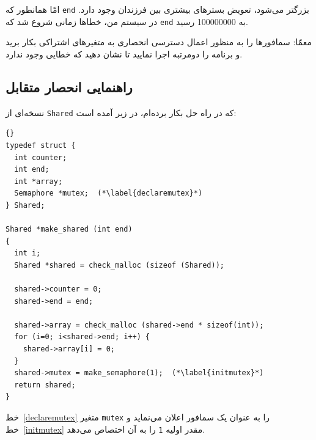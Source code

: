 \documentclass{book}
\newcommand{\clearemptydoublepage}{\newpage\cleardoublepage}
\begin{document}
    امّا همانطور که {\tt end}  بزرگتر می‌شود، تعویض بسترهای بیشتری بین فرزندان وجود دارد. 
    در سیستم من، خطاها زمانی شروع شد که {\tt end} به  100000000 رسید. 

    معمّا:‌ سمافورها را به منظور اعمال دسترسی انحصاری به متغیرهای اشتراکی بکار برید و برنامه را دومرتبه اجرا نمایید تا نشان دهید که خطایی وجود ندارد. 
    

\clearemptydoublepage
\subsection{راهنمایی انحصار متقابل}

    نسخه‌ای از {\tt Shared} که در راه حل بکار برده‌ام، در زیر آمده است:

\begin{latin}
\begin{lstlisting}[title={}]{}
typedef struct {
  int counter;
  int end;
  int *array;
  Semaphore *mutex;  (*\label{declaremutex}*)
} Shared;

Shared *make_shared (int end)
{
  int i;
  Shared *shared = check_malloc (sizeof (Shared));

  shared->counter = 0;
  shared->end = end;

  shared->array = check_malloc (shared->end * sizeof(int));
  for (i=0; i<shared->end; i++) {
    shared->array[i] = 0;
  }
  shared->mutex = make_semaphore(1);  (*\label{initmutex}*)
  return shared;
}
\end{lstlisting}
\end{latin}

    خط~\ref{declaremutex} متغیر  {\tt mutex} را به عنوان یک سمافور اعلان می‌نماید و 
    خط~\ref{initmutex} مقدر اولیه  {\tt 1} را به آن اختصاص می‌دهد. 

\end{document}
